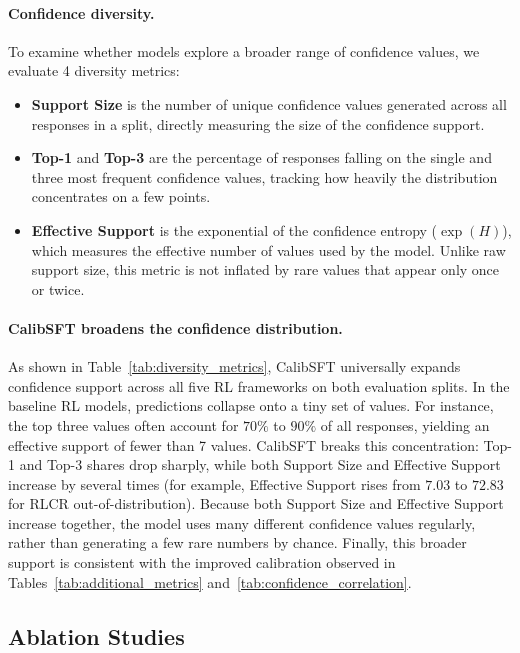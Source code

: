 \documentclass{article} %
\begin{document}
\paragraph{Confidence diversity.}
To examine whether models explore a broader range of confidence values, we evaluate 4 diversity metrics:
\begin{itemize}
    \item \textbf{Support Size} is the number of unique confidence values generated across all responses in a split, directly measuring the size of the confidence support.
    
    \item \textbf{Top-1} and \textbf{Top-3} are the percentage of responses falling on the single and three most frequent confidence values, tracking how heavily the distribution concentrates on a few points.
    
    \item \textbf{Effective Support} is the exponential of the confidence entropy ($\exp(H)$), which measures the effective number of values used by the model. Unlike raw support size, this metric is not inflated by rare values that appear only once or twice.
\end{itemize}



\paragraph{CalibSFT broadens the confidence distribution.}
As shown in Table~\ref{tab:diversity_metrics}, CalibSFT universally expands confidence support across all five RL frameworks on both evaluation splits.
In the baseline RL models, predictions collapse onto a tiny set of values. 
For instance, the top three values often account for $70\%$ to $90\%$ of all responses, yielding an effective support of fewer than 7 values.
CalibSFT breaks this concentration: Top-1 and Top-3 shares drop sharply, while both Support Size and Effective Support increase by several times (for example, Effective Support rises from $7.03$ to $72.83$ for RLCR out-of-distribution).
Because both Support Size and Effective Support increase together, the model uses many different confidence values regularly, rather than generating a few rare numbers by chance.
Finally, this broader support is consistent with the improved calibration observed in Tables~\ref{tab:additional_metrics} and~\ref{tab:confidence_correlation}.


\subsection{Ablation Studies}
\label{sec:ablation_studies}
\end{document}
